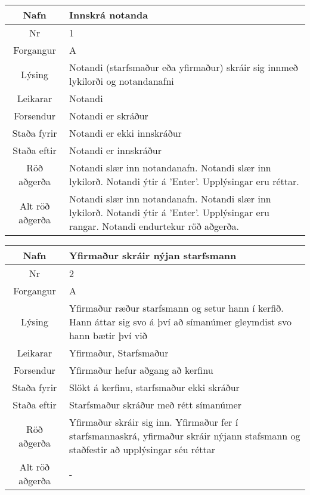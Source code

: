 \begin{table}[h!]\centering
\begin{tabular}{|c|p{10cm}|}
\hline
Nafn&Innskrá notanda\\
\hline
Nr&1\\
\hline
Forgangur&A\\
\hline
Lýsing&Notandi (starfsmaður eða yfirmaður) skráir sig innmeð lykilorði og notandanafni\\
\hline
Leikarar&Notandi\\
\hline
Forsendur&Notandi er skráður\\
\hline
Staða fyrir&Notandi er ekki innskráður\\
\hline
Staða eftir&Notandi er innskráður\\
\hline
Röð aðgerða&Notandi slær inn notandanafn. Notandi slær inn lykilorð. Notandi ýtir á ’Enter’. Upplýsingar eru réttar.\\
\hline
Alt röð aðgerða&Notandi slær inn notandanafn. Notandi slær inn lykilorð. Notandi ýtir á ’Enter’. Upplýsingar eru rangar. Notandi endurtekur röð aðgerða.\\
\hline
\end{tabular}
\end{table}
\caption{Use case 1}\label{tab:use_case_1}
\begin{table}[h!]\centering
\begin{tabular}{|c|p{10cm}|}
\hline
Nafn&Yfirmaður skráir nýjan starfsmann\\
\hline
Nr&2\\
\hline
Forgangur&A\\
\hline
Lýsing&Yfirmaður ræður starfsmann og setur hann í kerfið. Hann áttar sig svo á því að símanúmer gleymdist svo hann bætir því við\\
\hline
Leikarar&Yfirmaður, Starfsmaður\\
\hline
Forsendur&Yfirmaður hefur aðgang að kerfinu\\
\hline
Staða fyrir&Slökt á kerfinu, starfsmaður ekki skráður\\
\hline
Staða eftir&Starfsmaður skráður með rétt símanúmer\\
\hline
Röð aðgerða&Yfirmaður skráir sig inn. Yfirmaður fer í starfsmannaskrá, yfirmaður skráir nýjann stafsmann og staðfestir að upplýsingar séu réttar\\
\hline
Alt röð aðgerða&-\\
\hline
\end{tabular}
\end{table}
\caption{Use case 2}\label{tab:use_case_2}
